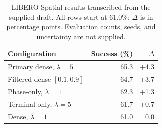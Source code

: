 \begin{table}[t]
\caption{LIBERO-Spatial results transcribed from the supplied draft. All rows start at 61.0\%; $\Delta$ is in percentage points. Evaluation counts, seeds, and uncertainty are not supplied.}
\label{tab:libero}\centering\small
\begin{tabular}{@{}lrr@{}}\toprule
Configuration & Success (\%) & $\Delta$\\\midrule
Primary dense, $\lambda=5$ & 65.3 & +4.3\\
Filtered dense $[0.1,0.9]$ & 64.7 & +3.7\\
Phase-only, $\lambda=1$ & 62.3 & +1.3\\
Terminal-only, $\lambda=5$ & 61.7 & +0.7\\
Dense, $\lambda=1$ & 61.0 & 0.0\\\bottomrule
\end{tabular}
\end{table}
